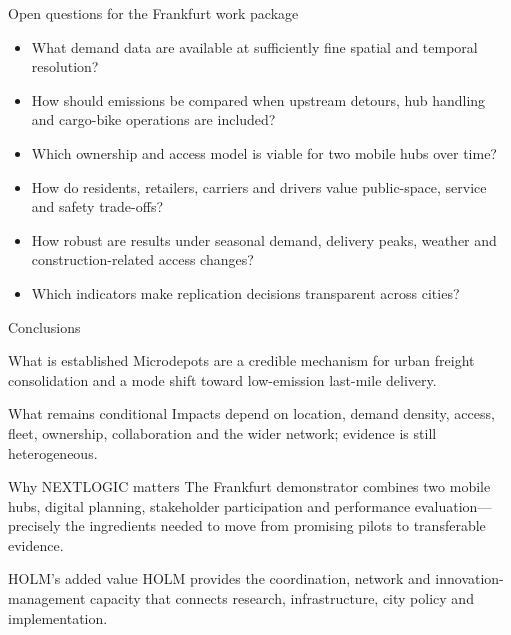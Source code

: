 \documentclass[aspectratio=169,11pt]{beamer}
\newcommand{\source}[1]{\par\vspace{2pt}{\tiny\textcolor{gray}{Source: #1}}}
\begin{document}
\begin{frame}{Open questions for the Frankfurt work package}
\begin{itemize}
  \item What demand data are available at sufficiently fine spatial and temporal resolution?
  \item How should emissions be compared when upstream detours, hub handling and cargo-bike operations are included?
  \item Which ownership and access model is viable for two mobile hubs over time?
  \item How do residents, retailers, carriers and drivers value public-space, service and safety trade-offs?
  \item How robust are results under seasonal demand, delivery peaks, weather and construction-related access changes?
  \item Which indicators make replication decisions transparent across cities?
\end{itemize}
\source{Synthesis of the provided literature, Frankfurt data overview and NEXTLOGIC project description.}
\end{frame}

\begin{frame}{Conclusions}
\footnotesize
\begin{block}{What is established}
Microdepots are a credible mechanism for urban freight consolidation and a mode shift toward low-emission last-mile delivery.
\end{block}
\begin{block}{What remains conditional}
Impacts depend on location, demand density, access, fleet, ownership, collaboration and the wider network; evidence is still heterogeneous.
\end{block}
\begin{block}{Why NEXTLOGIC matters}
The Frankfurt demonstrator combines two mobile hubs, digital planning, stakeholder participation and performance evaluation---precisely the ingredients needed to move from promising pilots to transferable evidence.
\end{block}
\begin{block}{HOLM's added value}
HOLM provides the coordination, network and innovation-management capacity that connects research, infrastructure, city policy and implementation.
\end{block}
\end{frame}
\end{document}

